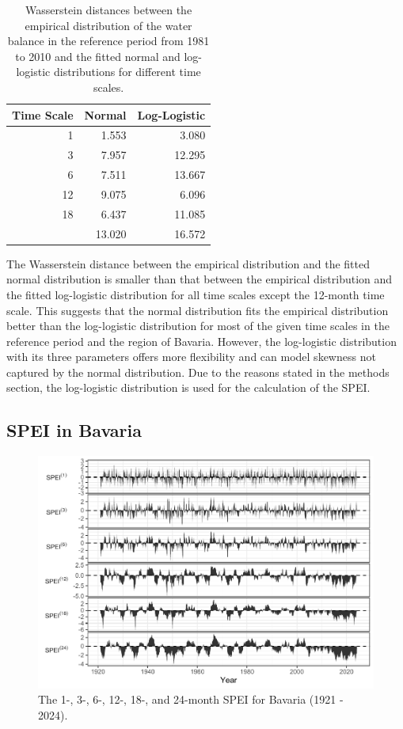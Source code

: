 \documentclass[
]{krantz}
\begin{document}
\begin{table}

\caption{\label{tab:wassersteinDistance}Wasserstein distances between the empirical distribution of the water balance in the reference period from 1981 to 2010 and the fitted normal and log-logistic distributions for different time scales.}
\centering
\begin{tabular}[t]{rrr}
\toprule
Time Scale & Normal & Log-Logistic\\
\midrule
1 & 1.553 & 3.080\\
3 & 7.957 & 12.295\\
6 & 7.511 & 13.667\\
12 & 9.075 & 6.096\\
18 & 6.437 & 11.085\\
\addlinespace
24 & 13.020 & 16.572\\
\bottomrule
\end{tabular}
\end{table}

The Wasserstein distance between the empirical distribution and the fitted normal distribution is smaller than that between the empirical distribution and the fitted log-logistic distribution for all time scales except the 12-month time scale.
This suggests that the normal distribution fits the empirical distribution better than the log-logistic distribution for most of the given time scales in the reference period and the region of Bavaria.
However, the log-logistic distribution with its three parameters offers more flexibility and can model skewness not captured by the normal distribution.
Due to the reasons stated in the methods section, the log-logistic distribution is used for the calculation of the SPEI.

\subsection{SPEI in Bavaria}\label{spei-in-bavaria}

\begin{figure}
\centering
\includegraphics{book_files/figure-latex/spei-1.pdf}
\caption{\label{fig:spei}The 1-, 3-, 6-, 12-, 18-, and 24-month SPEI for Bavaria (1921 - 2024).}
\end{figure}
\end{document}
